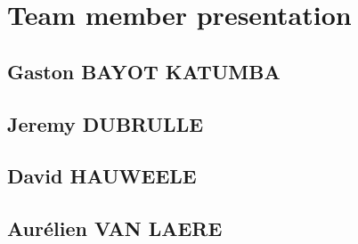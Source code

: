 \documentclass[a4paper,10pt]{article}
\begin{document}
\section{Team member presentation}

\subsection{Gaston BAYOT KATUMBA}


\subsection{Jeremy DUBRULLE}


\subsection{David HAUWEELE}


\subsection{Aurélien VAN LAERE}


 
\end{document}
